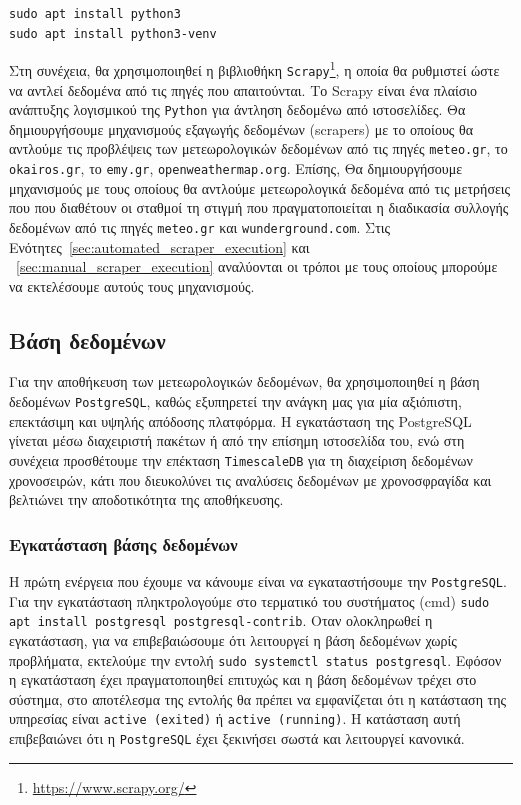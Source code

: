 \documentclass[a4paper,12pt]{article}
\begin{document}
\begin{lstlisting}
sudo apt install python3
sudo apt install python3-venv
\end{lstlisting}

Στη συνέχεια, θα χρησιμοποιηθεί η βιβλιοθήκη \texttt{Scrapy}\footnote{\url{https://www.scrapy.org/}}, η οποία θα ρυθμιστεί ώστε να αντλεί δεδομένα από τις πηγές που απαιτούνται. Το Scrapy είναι ένα πλαίσιο ανάπτυξης λογισμικού της \texttt{Python} για άντληση δεδομένω από ιστοσελίδες. Θα δημιουργήσουμε μηχανισμούς εξαγωγής δεδομένων (scrapers) με το οποίους θα αντλούμε τις προβλέψεις των μετεωρολογικών δεδομένων από τις πηγές \texttt{meteo.gr}, το \texttt{okairos.gr}, το \texttt{emy.gr}, \texttt{openweathermap.org}. Επίσης, Θα δημιουργήσουμε μηχανισμούς με τους οποίους θα αντλούμε μετεωρολογικά δεδομένα από τις μετρήσεις που που διαθέτουν οι σταθμοί τη στιγμή που πραγματοποιείται η διαδικασία συλλογής δεδομένων από τις πηγές \texttt{meteo.gr} και \texttt{wunderground.com}. Στις Ενότητες~\ref{sec:automated_scraper_execution} και ~\ref{sec:manual_scraper_execution} αναλύονται οι τρόποι με τους οποίους μπορούμε να εκτελέσουμε αυτούς τους μηχανισμούς.

\subsection{Βάση δεδομένων}\label{sec:database}
Για την αποθήκευση των μετεωρολογικών δεδομένων, θα χρησιμοποιηθεί η βάση δεδομένων \texttt{PostgreSQL}, καθώς εξυπηρετεί την ανάγκη μας για μία αξιόπιστη, επεκτάσιμη και υψηλής απόδοσης πλατφόρμα. Η εγκατάσταση της PostgreSQL γίνεται μέσω διαχειριστή πακέτων ή από την επίσημη ιστοσελίδα του, ενώ στη συνέχεια προσθέτουμε την επέκταση \texttt{TimescaleDB} για τη διαχείριση δεδομένων χρονοσειρών, κάτι που διευκολύνει τις αναλύσεις δεδομένων με χρονοσφραγίδα και βελτιώνει την αποδοτικότητα της αποθήκευσης.
    
\subsubsection{Εγκατάσταση βάσης δεδομένων}\label{sec:database_installation}
Η πρώτη ενέργεια που έχουμε να κάνουμε είναι να εγκαταστήσουμε την \texttt{PostgreSQL}. Για την εγκατάσταση πληκτρολογούμε στο τερματικό του συστήματος (cmd) \texttt{sudo apt install postgresql postgresql-contrib}. Οταν ολοκληρωθεί η εγκατάσταση, για να επιβεβαιώσουμε ότι λειτουργεί η βάση δεδομένων χωρίς προβλήματα, εκτελούμε την εντολή \texttt{sudo systemctl status postgresql}. Εφόσον η εγκατάσταση έχει πραγματοποιηθεί επιτυχώς και η βάση δεδομένων τρέχει στο σύστημα, στο αποτέλεσμα της εντολής θα πρέπει να εμφανίζεται ότι η κατάσταση της υπηρεσίας είναι \texttt{active (exited)} ή \texttt{active (running)}. Η κατάσταση αυτή επιβεβαιώνει ότι η \texttt{PostgreSQL} έχει ξεκινήσει σωστά και λειτουργεί κανονικά.
\end{document}
